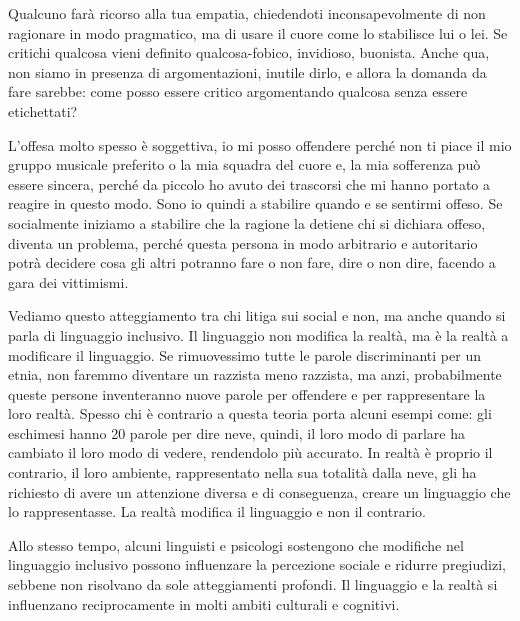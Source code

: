 \documentclass[12pt]{book} %
\begin{document}
Qualcuno farà ricorso alla tua empatia, chiedendoti inconsapevolmente di non ragionare in modo pragmatico, ma di usare il cuore come lo stabilisce lui o lei. Se critichi qualcosa vieni definito qualcosa-fobico, invidioso, buonista. Anche qua, non siamo in presenza di argomentazioni, inutile dirlo, e allora la domanda da fare sarebbe: come posso essere critico argomentando qualcosa senza essere etichettati?

L'offesa molto spesso è soggettiva, io mi posso offendere perché non ti piace il mio gruppo musicale preferito o la mia
squadra del cuore e, la mia sofferenza può essere sincera, perché da piccolo ho avuto dei trascorsi che mi hanno
portato a reagire in questo modo. Sono io quindi a stabilire quando e se sentirmi offeso. Se socialmente iniziamo a
stabilire che la ragione la detiene chi si dichiara offeso, diventa un problema, perché questa persona in modo
arbitrario e autoritario potrà decidere cosa gli altri potranno fare o non fare, dire o non dire, facendo a gara dei
vittimismi.

Vediamo questo atteggiamento tra chi litiga sui social e non, ma anche quando si parla di linguaggio inclusivo. Il
linguaggio non modifica la realtà, ma è la realtà a modificare il linguaggio. Se rimuovessimo tutte le parole
discriminanti per un etnia, non faremmo diventare un razzista meno razzista, ma anzi, probabilmente queste persone
inventeranno nuove parole per offendere e per rappresentare la loro realtà.
Spesso chi è contrario a questa teoria porta alcuni esempi come: gli eschimesi hanno 20 parole per dire neve, quindi, il loro modo di parlare ha cambiato il loro modo di vedere, rendendolo più accurato. In realtà è proprio il contrario, il loro ambiente, rappresentato nella sua totalità dalla neve, gli ha richiesto di avere un attenzione diversa e di conseguenza, creare un linguaggio che lo rappresentasse. La realtà modifica il linguaggio e non il contrario.

Allo stesso tempo, alcuni linguisti e psicologi sostengono che modifiche nel linguaggio inclusivo possono influenzare la percezione sociale e ridurre pregiudizi, sebbene non risolvano da sole atteggiamenti profondi. Il linguaggio e la realtà si influenzano reciprocamente in molti ambiti culturali e cognitivi.
\end{document}
